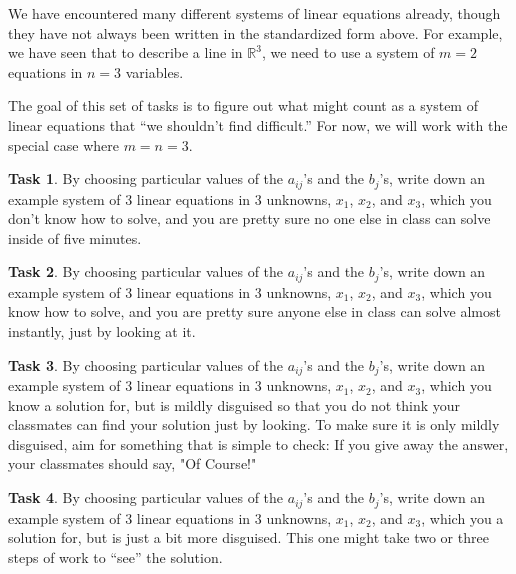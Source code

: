 \documentclass{tufte-book}
\theoremstyle{definition}
\newtheorem{task}{Task}
\begin{document}
We have encountered many different systems of linear equations already, though they 
have not always been written in the standardized form above. For example, we have seen
that to describe a line in $\mathbb{R}^3$, we need to use a system of $m=2$ equations in 
$n=3$ variables.

The goal of this set of tasks is to figure out what might count as a system of linear
equations that ``we shouldn't find difficult.'' For now, we will work with the special case where $m=n=3$.

\begin{task}
By choosing particular values of the $a_{ij}$'s and the $b_j$'s,
write down an example system of $3$ linear equations in $3$ unknowns, $x_1$, $x_2$, and $x_3$, which you don't know how to solve, and you are pretty sure no one else in class can solve inside of five minutes.
\end{task}

\begin{task}
By choosing particular values of the $a_{ij}$'s and the $b_j$'s,
write down an example system of $3$ linear equations in $3$ unknowns, $x_1$, $x_2$, and $x_3$, which you know how to solve, and you are pretty sure anyone else in class can solve almost instantly, just by looking at it.
\end{task}

\clearpage

\begin{task}
By choosing particular values of the $a_{ij}$'s and the $b_j$'s,
write down an example system of $3$ linear equations in $3$ unknowns, $x_1$, $x_2$, and $x_3$, which you know a solution for, but is mildly disguised so that you do not think your classmates can find your solution just by looking. To make sure it is only mildly disguised, aim for something that is simple to check: If you give away the answer, your classmates should say, "Of Course!"
\end{task}

\begin{task}
By choosing particular values of the $a_{ij}$'s and the $b_j$'s,
write down an example system of $3$ linear equations in $3$ unknowns, $x_1$, $x_2$, and $x_3$, which you a solution for, but is just a bit more disguised. This one might take two or three steps of work to ``see'' the solution.
\end{task}
\end{document}

